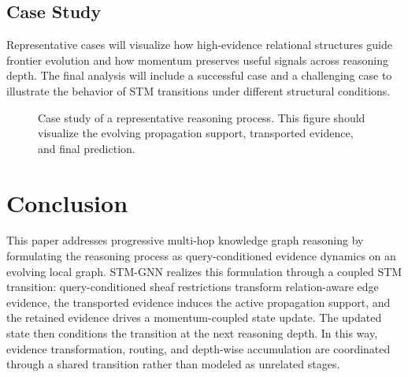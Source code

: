 \documentclass[a4paper,fleqn]{cas-sc}
\begin{document}
\subsection{Case Study}\label{subsec:case_study}

Representative cases will visualize how high-evidence relational structures
guide frontier evolution and how momentum preserves useful signals across
reasoning depth. The final analysis will include a successful case and a
challenging case to illustrate the behavior of STM transitions under different
structural conditions.

\begin{figure}[pos=htbp]
\centering
{}
\caption{Case study of a representative reasoning process. This figure should
visualize the evolving propagation support, transported evidence, and final
prediction.}
\label{fig:case_study}
\end{figure}
\FloatBarrier




\section{Conclusion}\label{sec:conclusion}

This paper addresses progressive multi-hop knowledge graph reasoning by
formulating the reasoning process as query-conditioned evidence dynamics on an
evolving local graph. STM-GNN realizes this formulation through a coupled STM
transition: query-conditioned sheaf restrictions transform relation-aware edge
evidence, the transported evidence induces the active propagation support, and
the retained evidence drives a momentum-coupled state update. The updated state
then conditions the transition at the next reasoning depth. In this way,
evidence transformation, routing, and depth-wise accumulation are coordinated
through a shared transition rather than modeled as unrelated stages.
\end{document}
